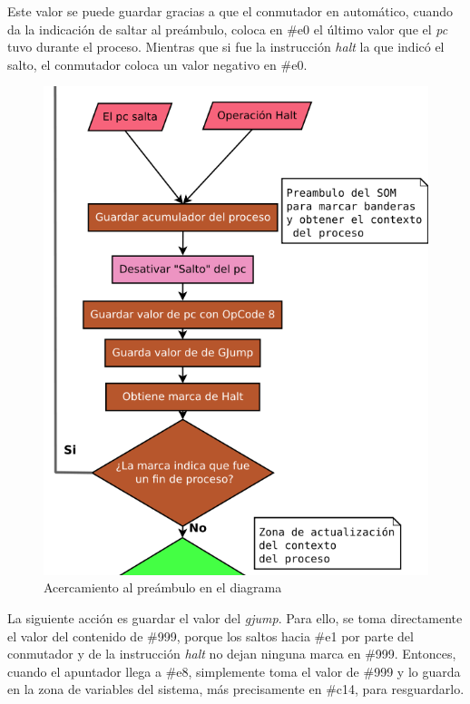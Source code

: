 \documentclass[letterpaper,12pt,oneside]{book}
\begin{document}
		Este valor se
		puede guardar
		gracias a que el conmutador en automático, cuando da la indicación de saltar al preámbulo, coloca en \#e0 el último valor que el \textit{pc}
		tuvo 
		durante el proceso. Mientras que si fue la instrucción
		\textit{halt} la que indicó el salto, el conmutador coloca un valor negativo en \#e0.

        \begin{figure}[h]		
			\centering
			\includegraphics[scale=0.4]{media/CARDIACC/diagPreambulo.png}
			\caption{Acercamiento al preámbulo en el diagrama}
			\label{fig:diagZoomPreambulo}
		\end{figure}
  
        La siguiente acción es guardar el valor del \textit{gjump}. Para ello, se toma directamente el valor del
		contenido de \#999, porque los saltos hacia \#e1 por parte del conmutador y de la instrucción \textit{halt} no dejan ninguna marca en \#999.
		Entonces, cuando el apuntador llega a \#e8, simplemente toma el
		valor de \#999 y lo guarda en la zona de variables del sistema, más precisamente en \#c14, para resguardarlo.
  
\end{document}
